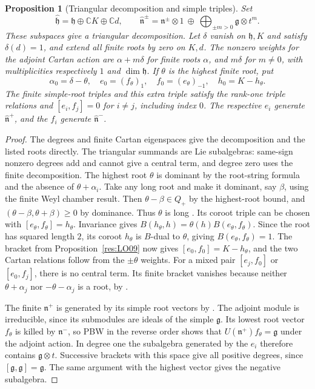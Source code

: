 \documentclass[11pt,oneside,openany]{book}
\newtheorem{proposition}[theorem]{Proposition}
\theoremstyle{definition}
\theoremstyle{remark}
\begin{document}
\begin{proposition}[Triangular decomposition and simple triples]
\label{res:LO10}
Set
\[
 \widehat{\mathfrak h}=\mathfrak h\oplus\mathbb C K\oplus\mathbb C d,
 \qquad
 \widehat{\mathfrak n}^{\pm}
 =\mathfrak n^\pm\otimes 1\ \oplus\
    \bigoplus_{\pm m>0}\mathfrak g\otimes t^m .
\]
These subspaces give a triangular decomposition.
Let \(\delta\) vanish on \(\mathfrak h,K\) and satisfy
\(\delta(d)=1\), and extend all finite roots by zero on \(K,d\).
The nonzero weights for the adjoint Cartan action are
\(\alpha+m\delta\) for finite roots \(\alpha\), and
\(m\delta\) for \(m\ne0\), with multiplicities respectively
\(1\) and \(\dim\mathfrak h\).
If \(\theta\) is the highest finite root, put
\[
 \alpha_0=\delta-\theta,\quad
 e_0=(f_\theta)_1,\quad
 f_0=(e_\theta)_{-1},\quad h_0=K-h_\theta .
\]
The finite simple-root triples and this extra triple satisfy
the rank-one triple relations and
\([e_i,f_j]=0\) for \(i\ne j\), including index \(0\).
The respective \(e_i\) generate \(\widehat{\mathfrak n}^+\),
and the \(f_i\) generate \(\widehat{\mathfrak n}^-\).
\end{proposition}
\begin{proof}
The degrees and finite Cartan eigenspaces give the decomposition
and the listed roots directly. The triangular summands are
Lie subalgebras: same-sign nonzero degrees add and cannot give
a central term, and degree zero uses the finite decomposition.
The highest root \(\theta\) is dominant by the root-string formula
and the absence of \(\theta+\alpha_i\).
Take any long root and make it dominant, say \(\beta\),
using the finite Weyl chamber result. Then
\(\theta-\beta\in Q_+\) by the highest-root bound, and
\((\theta-\beta,\theta+\beta)\ge0\) by dominance.
Thus \(\theta\) is long
\cite[Results D04, E03 and E09, PDF pp.~24--25, 30--31, 34--35]{mg-lie}.
Its coroot triple can be chosen with \([e_\theta,f_\theta]=h_\theta\).
Invariance gives
\(B(h_\theta,h)=\theta(h)B(e_\theta,f_\theta)\).
Since the root has squared length \(2\), its coroot \(h_\theta\)
is \(B\)-dual to \(\theta\), giving \(B(e_\theta,f_\theta)=1\).
The bracket from Proposition~\ref{res:LO09} now gives
\([e_0,f_0]=K-h_\theta\), and the two Cartan relations
follow from the \(\pm\theta\) weights. For a mixed pair
\([e_j,f_0]\) or \([e_0,f_j]\), there is no central term.
Its finite bracket vanishes because neither
\(\theta+\alpha_j\) nor \(-\theta-\alpha_j\) is a root, by
\cite[Result E09, PDF pp.~34--35]{mg-lie}.

The finite \(\mathfrak n^+\) is generated by its simple root
vectors by \cite[Results F01--F03, PDF pp.~36--38]{mg-lie}.
The adjoint module is irreducible, since its submodules are
ideals of the simple \(\mathfrak g\). Its lowest root vector
\(f_\theta\) is killed by \(\mathfrak n^-\), so PBW in the
reverse order shows that \(U(\mathfrak n^+)f_\theta=\mathfrak g\)
under the adjoint action. In degree one the subalgebra
generated by the \(e_i\) therefore contains
\(\mathfrak g\otimes t\). Successive brackets with this space
give all positive degrees, since \([\mathfrak g,\mathfrak g]
=\mathfrak g\). The same argument with the highest vector
gives the negative subalgebra.
\end{proof}
\end{document}
